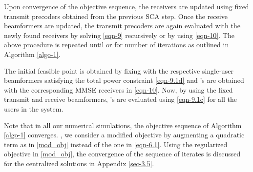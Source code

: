 {Upon convergence of the objective sequence, the receivers are updated using fixed transmit precoders  obtained from the previous \ac{SCA} step. Once the receive beamformers are updated, the transmit precoders are again evaluated with the newly found receivers by solving \eqref{eqn-9} recursively or by using \eqref{eqn-10}. The above procedure is repeated until  or for  number of iterations as outlined in Algorithm \ref{algo-1}.

The initial feasible point  is obtained by fixing  with the respective single-user beamformers satisfying the total power constraint \eqref{eqn-9.1d} and 's are obtained with the corresponding \ac{MMSE} receivers in \eqref{eqn-10}. Now, by using the fixed transmit and receive beamformers, 's are evaluated using \eqref{eqn-9.1c} for all the users in the system. 

Note that in all our numerical simulations, the objective sequence of Algorithm \ref{algo-1} converges. , we consider a modified objective by augmenting a quadratic term as in \eqref{mod_obj} instead of the one in \eqref{eqn-6.1}. Using the regularized objective in \eqref{mod_obj}, the convergence of the sequence of iterates is discussed for the centralized solutions in Appendix \ref{sec-3.5}.}
